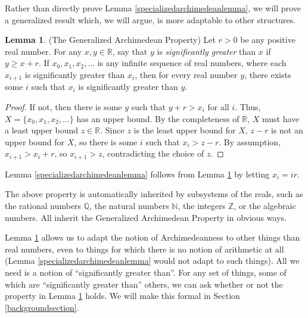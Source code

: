 \documentclass[reqno]{article}
\theoremstyle{definition}
\newtheorem{lemma}[theorem]{Lemma}
\begin{document}
Rather than directly prove Lemma \ref{specializedarchimedeanlemma},
we will prove a generalized result which, we will argue, is
more adaptable to other structures.

\begin{lemma}
\label{generalizedarchimedeanlemma}
(The Generalized Archimedean Property)
Let $r>0$ be any positive real number.
For any $x,y\in\mathbb R$, say that $y$ is \emph{significantly greater}
than $x$ if $y\geq x+r$.
If $x_0,x_1,x_2,\ldots$ is any infinite sequence of real numbers,
where each $x_{i+1}$ is significantly greater than $x_i$, then for every real number $y$,
there exists some $i$ such that $x_i$ is significantly greater than $y$.
\end{lemma}

\begin{proof}
If not, then there is some $y$ such that $y+r > x_i$ for all $i$.
Thus, $X=\{x_0,x_1,x_2,\ldots\}$ has an upper bound. By the completeness
of $\mathbb R$, $X$ must have a least upper bound $z\in\mathbb R$.
Since $z$ is the least upper bound for $X$, $z-r$ is not an upper bound
for $X$, so there is some $i$ such that $x_i>z-r$.
By assumption, $x_{i+1}>x_i+r$, so $x_{i+1}>z$, contradicting the choice
of $z$.
\end{proof}

Lemma \ref{specializedarchimedeanlemma} follows from
Lemma \ref{generalizedarchimedeanlemma} by letting $x_i=ir$.

The above property is automatically inherited by subsystems
of the reals, such as the rational numbers $\mathbb Q$, the natural
numbers $\mathbb N$, the integers $\mathbb Z$, or the algebraic numbers.
All inherit the Generalized Archimedean Property in obvious ways.

Lemma \ref{generalizedarchimedeanlemma} allows us to adapt the notion
of Archimedeanness to other things than real numbers, even to things
for which there is no notion of arithmetic at all
(Lemma \ref{specializedarchimedeanlemma} would not adapt to such things).
All we need is a notion of ``significantly greater than''.
For any set of things, some of which are ``significantly greater than''
others, we can ask whether or not the property in Lemma
\ref{generalizedarchimedeanlemma} holds. We will make this formal in
Section \ref{backgroundsection}.
\end{document}

